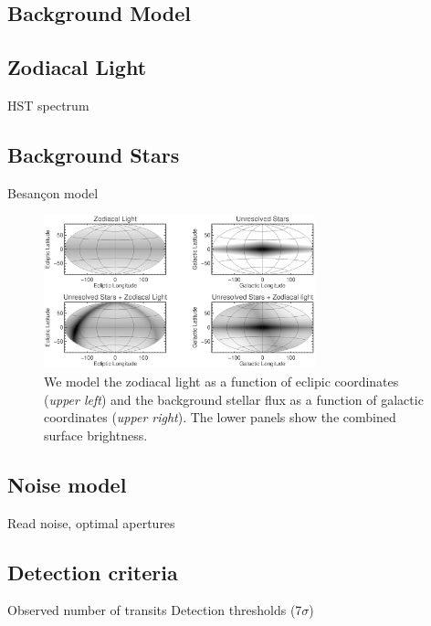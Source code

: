 \documentclass[preprint]{aastex}
\begin{document}
\subsection{Background Model}
\subsection{Zodiacal Light}
HST spectrum
\subsection{Background Stars}
Besan\c{c}on model

\begin{figure}[hbtp]
\begin{center}
\includegraphics[width=0.7\textwidth]{bgmap.eps}
\caption{We model the zodiacal light as a function of eclipic coordinates (\textit{upper left}) and the background stellar flux as a function of galactic coordinates (\textit{upper right}). The lower panels show the combined surface brightness.}
\end{center}
\end{figure}

\subsection{Noise model}
Read noise, optimal apertures
\subsection{Detection criteria}
Observed number of transits
Detection thresholds (7$\sigma$)
\end{document}
